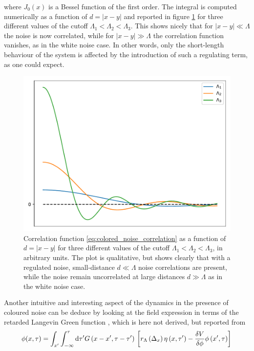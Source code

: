 where $J_0(x)$ is a Bessel function of the first order. The integral is computed numerically as a function of $d=|x-y|$ and reported in figure \ref{fig:bessel} for three different values of the cutoff $\Lambda_1 < \Lambda_2 < \Lambda_3$. This shows nicely that for $|x-y| \ll \Lambda$ the noise is now correlated, while for $|x-y| \gg \Lambda$ the correlation function vanishes, as in the white noise case. In other words, only the short-length behaviour of the system is affected by the introduction of such a regulating term, as one could expect.\\
\begin{figure}
    \centering
    \includegraphics[scale=0.5]{figures/bessel.pdf}
    \caption[Correlated noise]{Correlation function \eqref{eq:colored_noise_correlation} as a function of $d=|x-y|$ for three different values of the cutoff $\Lambda_1 < \Lambda_2 < \Lambda_3$, in arbitrary units. The plot is qualitative, but shows clearly that with a regulated noise, small-distance $d \ll \Lambda$ noise correlations are present, while the noise remain uncorrelated at large distances $d \gg \Lambda$ as in the white noise case.}
    \label{fig:bessel}
\end{figure}
Another intuitive and interesting aspect of the dynamics in the presence of coloured noise can be deduce by looking at the field expression in terms of the retarded Langevin Green function \cite{Damgaard1987StochasticQuantization}, which is here not derived, but reported from \cite{Pawlowski2017CoolingNoise}
\begin{equation*}
        \phi(x, \tau) = \int_{x^{\prime}} \int_{-\infty}^\tau \mathrm{d} \tau^{\prime} G\left(x-x^{\prime}, \tau-\tau^{\prime}\right) \, \left[r_{\Lambda}\left(\Delta_x\right) \eta\left(x, \tau^{\prime}\right)-\frac{\delta V}{\delta \phi} \phi\left(x^{\prime}, \tau\right)\right] \\
\end{equation*}
